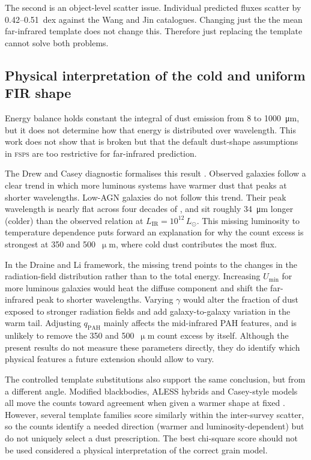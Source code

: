 \documentclass[12pt,a4paper]{article}
\begin{document}
The second is an object-level scatter issue. Individual predicted fluxes scatter by
0.42--\SI{0.51}{dex} against the Wang and Jin catalogues. Changing just the
the mean far-infrared template does not change this. Therefore just replacing the
template cannot solve both problems.

\subsection{Physical interpretation of the cold and uniform FIR shape}
\label{sec:discussion:cold}

Energy balance holds constant the integral of dust emission from 8 to \SI{1000}{\um}, but it
does not determine how that energy is distributed over wavelength. This work does not
show that \LIR{} is broken but that the default dust-shape assumptions in
\textsc{fsps} are too restrictive for far-infrared prediction.

The Drew and Casey diagnostic formalises this result \citep{Drew_2022}. Observed galaxies
follow a clear trend in which more luminous systems have warmer dust that peaks at
shorter wavelengths. Low-AGN \popcosmos{} galaxies do not follow this trend. Their
peak wavelength is nearly flat across four decades of \LIR{}, and sit roughly
\SI{34}{\um} longer (colder) than the observed relation at
$L_\mathrm{IR} = 10^{12}\,L_\odot$. This missing luminosity to temperature dependence
puts forward an explanation for why the count excess is strongest at 350 and
500~$\upmu$m, where cold dust contributes the most flux.

In the Draine and Li framework, the missing trend points to the changes in the
radiation-field distribution rather than to the total energy. Increasing
$U_{\min}$ for more luminous galaxies would heat the diffuse component and shift
the far-infrared peak to shorter wavelengths. Varying $\gamma$ would alter the
fraction of dust exposed to stronger radiation fields and add galaxy-to-galaxy variation
in the warm tail. Adjusting $q_{\mathrm{PAH}}$  mainly affects the mid-infrared PAH
features, and is unlikely to remove the 350 and 500~$\upmu$m count excess by itself.
Although the present results do not measure these parameters directly, they do identify which physical features a future \popcosmos{} extension should allow to vary.



The controlled template substitutions also support the same conclusion, but from a different angle. Modified blackbodies, ALESS hybrids and Casey-style models all move the
counts toward agreement when given a warmer shape at fixed \LIR{}
\citep{Casey_2012,daCunha_2015}. However, several template families score similarly
within the inter-survey scatter, so the counts identify a needed direction (warmer and
luminosity-dependent) but do not uniquely select a dust prescription. The best
chi-square score should not be used considered a physical interpretation of the correct grain model.
\end{document}
